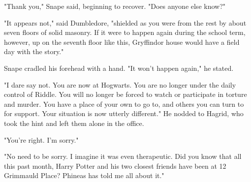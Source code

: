 "Thank you," Snape said, beginning to recover. "Does anyone else know?"

"It appears not," said Dumbledore, "shielded as you were from the rest by about seven floors of solid masonry. If it were to happen again during the school term, however, up on the seventh floor like this, Gryffindor house would have a field day with the story."

Snape cradled his forehead with a hand. "It won't happen again," he stated.

"I dare say not. You are now at Hogwarts. You are no longer under the daily control of Riddle. You will no longer be forced to watch or participate in torture and murder. You have a place of your own to go to, and others you can turn to for support. Your situation is now utterly different." He nodded to Hagrid, who took the hint and left them alone in the office.

"You're right. I'm sorry."

"No need to be sorry. I imagine it was even therapeutic. Did you know that all this past month, Harry Potter and his two closest friends have been at 12 Grimmauld Place? Phineas has told me all about it." 


